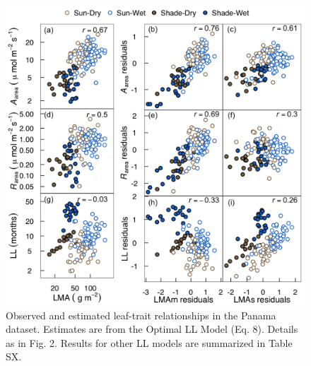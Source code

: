 \documentclass[
  12pt,
]{article}
\begin{document}
\newpage

\begin{figure}
\hypertarget{fig:PAplt}{%
\centering
\includegraphics{../figs/PA_3.png}
\caption{Observed and estimated leaf-trait relationships in the Panama dataset. Estimates are from the Optimal LL Model (Eq. 8). Details as in Fig. 2. Results for other LL models are summarized in Table SX.}\label{fig:PAplt}
}
\end{figure}

\newpage
\end{document}

